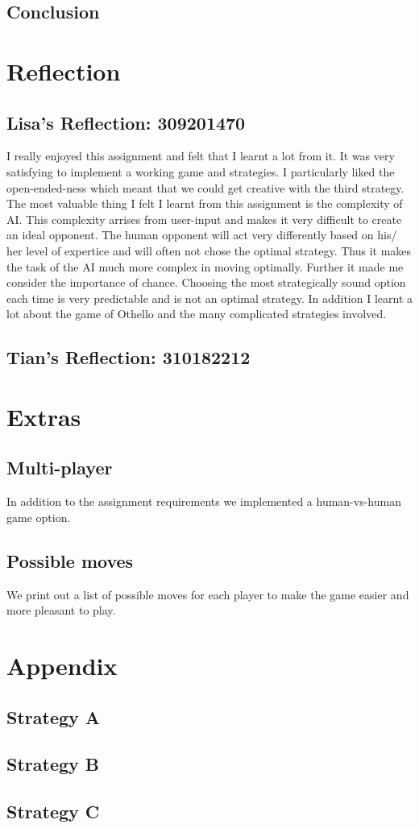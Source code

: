 \documentclass[12pt]{article}
\begin{document}
\subsection{Conclusion}

\section{Reflection}

\subsection{Lisa's Reflection: 309201470}

I really enjoyed this assignment and felt that I learnt a lot from it. It was very satisfying to implement a working game and strategies. I particularly liked the open-ended-ness which meant that we could get creative with the third strategy. The most valuable thing I felt I learnt from this assignment is the complexity of AI. This complexity arrises from user-input and makes it very difficult to create an ideal opponent. The human opponent will act very differently based on his/ her level of expertice and will often not chose the optimal strategy. Thus it makes the task of the AI much more complex in moving optimally. Further it made me consider the importance of chance. Choosing the most strategically sound option each time is very predictable and is not an optimal strategy. In addition I learnt a lot about the game of Othello and the many complicated strategies involved.

\subsection{Tian's Reflection: 310182212}

\section{Extras}

\subsection{Multi-player}
In addition to the assignment requirements we implemented a human-vs-human game option.

\subsection{Possible moves}
We print out a list of possible moves for each player to make the game easier and more pleasant to play.

\section{Appendix}

\subsection{Strategy A}

\subsection{Strategy B}

\subsection{Strategy C}



\end{document}
